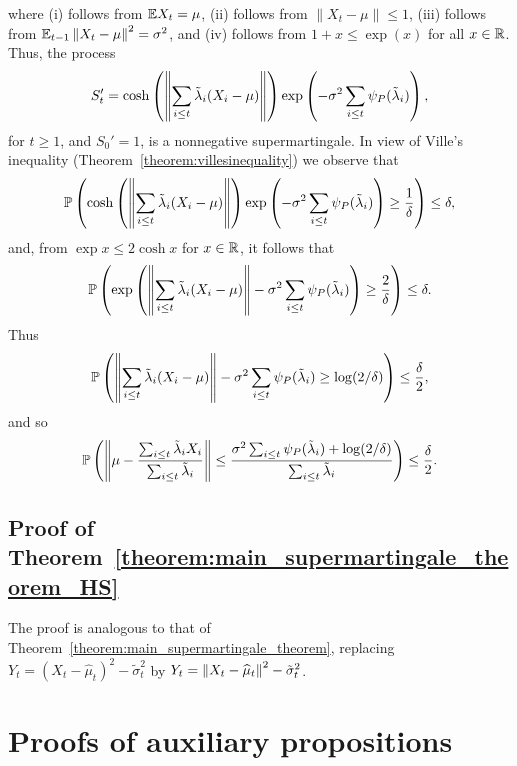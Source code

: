     where (i) follows from $\mathbb{E} X_t = \mu$, (ii) follows from $\|X_t- \mu\| \leq 1$, (iii) follows from $\mathbb{E}_{t-1} \left\| X_t-\mu\right\|^2  = \sigma^2$, and (iv) follows from $1 + x \leq \exp(x)$ for all $x \in \mathbb{R}$. Thus, the process
    \begin{align*}
        S_t' = \cosh \left(\left\|\sum_{i \leq t}\tilde\lambda_i (X_i-\mu)\right\|\right)\exp\left( - \sigma^2\sum_{i \leq t} \psi_P(\tilde\lambda_i)\right),
    \end{align*}
    for $t \geq 1$, and $S_0' = 1$, is a nonnegative supermartingale. In view of Ville's inequality (Theorem~\ref{theorem:villesinequality}) we observe that
    \begin{align*}
        \mathbb{P} \left( \cosh \left(\left\|\sum_{i \leq t}\tilde\lambda_i (X_i-\mu)\right\|\right)\exp\left( - \sigma^2\sum_{i \leq t} \psi_P(\tilde\lambda_i)\right) \geq \frac{1}{\delta} \right) \leq \delta,
    \end{align*}
    and, from $\exp x \leq2\cosh x$ for $x \in\mathbb{R}$, it follows that
    \begin{align*}
        \mathbb{P} \left( \exp \left( \left\|\sum_{i \leq t}\tilde\lambda_i (X_i-\mu)\right\| - \sigma^2\sum_{i \leq t} \psi_P(\tilde\lambda_i)\right) \geq \frac{2}{\delta} \right) \leq \delta.
    \end{align*}
    Thus
    \begin{align*}
        \mathbb{P} \left( \left\|\sum_{i \leq t}\tilde\lambda_i (X_i-\mu)\right\| - \sigma^2\sum_{i \leq t} \psi_P(\tilde\lambda_i) \geq \log (2/\delta) \right) \leq \frac{\delta}{2},
    \end{align*}
    and so 
    \begin{align*}
        \mathbb{P} \left( \left\|\mu-\frac{\sum_{i \leq t}\tilde\lambda_i X_i}{\sum_{i \leq t}\tilde\lambda_i} \right\|\leq \frac{\sigma^2\sum_{i \leq t} \psi_P(\tilde\lambda_i) + \log (2/\delta)}{\sum_{i \leq t} \tilde\lambda_i} \right) \leq \frac{\delta}{2}.
    \end{align*}


\subsection{Proof of Theorem~\ref{theorem:main_supermartingale_theorem_HS}} \label{proof:main_supermartingale_theorem_HS}

The proof is analogous to that of Theorem~\ref{theorem:main_supermartingale_theorem}, replacing $Y_t = (X_t - \widehat\mu_t)^2 - \tilde\sigma_t^2$ by $Y_t = \left\| X_t - \widehat\mu_t\right\|^2 - \tilde\sigma_t^2$.


\section{Proofs of auxiliary propositions} \label{appendix:auxiliary_propositions_proofs}

